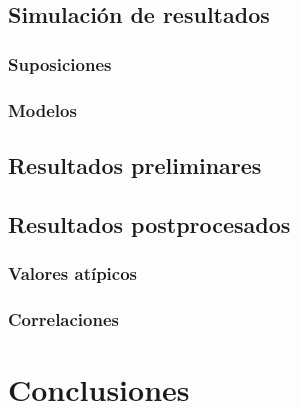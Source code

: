 \documentclass{book}
\begin{document}
\section{Simulación de resultados}
\subsection{Suposiciones}
\subsection{Modelos}
\section{Resultados preliminares}
\section{Resultados postprocesados}
\subsection{Valores atípicos}
\subsection{Correlaciones}
\chapter{Conclusiones}
\end{document}

